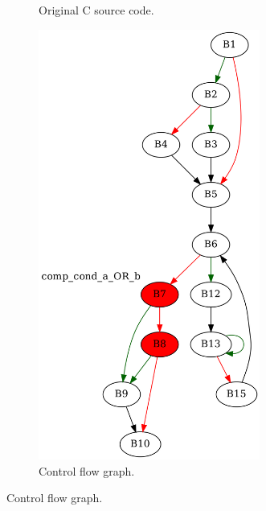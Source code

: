 \begin{figure}[htbp]
	\centering
	\begin{subfigure}[b]{0.30\textwidth}
		\centering
		
		\caption{Original C source code.}
	\end{subfigure}
	\begin{subfigure}[b]{0.50\textwidth}
		\centering
		\includegraphics[width=0.8\textwidth]{inc/appendices/examples/interval/example/sample/f_0001a.png}
		\caption{Control flow graph.}
	\end{subfigure}
\end{figure}

